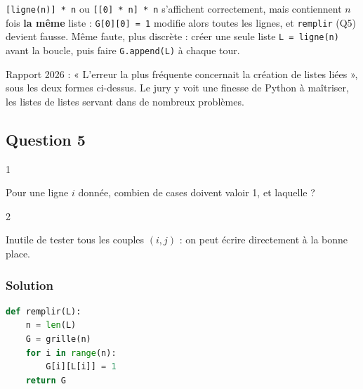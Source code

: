 \documentclass[11pt,a4paper]{article}
\begin{document}
\begin{piege}

\texttt{{[}ligne(n){]}\ *\ n} ou \texttt{{[}{[}0{]}\ *\ n{]}\ *\ n} s'affichent correctement, mais contiennent \(n\) fois \textbf{la même} liste : \texttt{G{[}0{]}{[}0{]}\ =\ 1} modifie alors toutes les lignes, et \texttt{remplir} (Q5) devient fausse. Même faute, plus discrète : créer une seule liste \texttt{L\ =\ ligne(n)} avant la boucle, puis faire \texttt{G.append(L)} à chaque tour.

\end{piege}

\begin{jury}

Rapport 2026 : « L'erreur la plus fréquente concernait la création de listes liées », sous les deux formes ci-dessus. Le jury y voit une finesse de Python à maîtriser, les listes de listes servant dans de nombreux problèmes.

\end{jury}

\hypertarget{question-5}{%
\subsection{Question 5}\label{question-5}}

\begin{indication}{1}

Pour une ligne \(i\) donnée, combien de cases doivent valoir 1, et laquelle ?

\end{indication}

\begin{indication}{2}

Inutile de tester tous les couples \((i, j)\) : on peut écrire directement à la bonne place.

\end{indication}

\hypertarget{solution-4}{%
\subsubsection{Solution}\label{solution-4}}

\begin{lstlisting}[language=Python]
def remplir(L):
    n = len(L)
    G = grille(n)
    for i in range(n):
        G[i][L[i]] = 1
    return G
\end{lstlisting}
\end{document}
